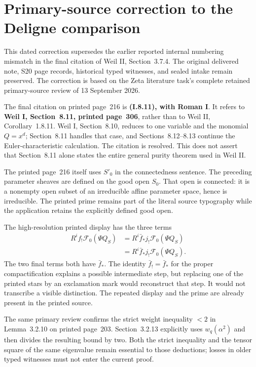 \section{Primary-source correction to the Deligne comparison}
\label{sec:deligne-primary-source-correction}

This dated correction supersedes the earlier reported internal numbering
mismatch in the final citation of Weil II, Section~3.7.4. The original
delivered note, S20 page records, historical typed witnesses, and sealed
intake remain preserved. The correction is based on the Zeta literature
task's complete retained primary-source review of 13 September 2026.

The final citation on printed page~216 is \textbf{(I.8.11), with Roman I}.
It refers to \textbf{Weil I, Section~8.11, printed page~306}, rather than
to Weil II, Corollary~1.8.11. Weil I, Section~8.10, reduces to one variable
and the monomial $Q=x^d$; Section~8.11 handles that case, and
Sections~8.12--8.13 continue the Euler-characteristic calculation.
The citation is resolved. This does not assert that Section~8.11 alone
states the entire general purity theorem used in Weil II.

The printed page~216 itself uses $S'_0$ in the connectedness sentence.
The preceding parameter sheaves are defined on the good open $S_0$.
That open is connected: it is a nonempty open subset of an irreducible
affine parameter space, hence is irreducible. The printed prime remains
part of the literal source typography while the application retains
the explicitly defined good open.

The high-resolution printed display has the three terms
\[
\begin{aligned}
 R^if_!\mathcal F_0(\Psi Q_S)
 &=R^i\bar f_*j_!\mathcal F_0(\Psi Q_S)\\
 &=R^i\bar f_*j_!\mathcal F_0(\Psi Q_S).
\end{aligned}
\]
The two final terms both have $\bar f_*$. The identity
$\bar f_!=\bar f_*$ for the proper compactification explains a
possible intermediate step, but replacing one of the printed stars
by an exclamation mark would reconstruct that step. It would not
transcribe a visible distinction. The repeated display and the prime
are already present in the printed source.

The same primary review confirms the strict weight inequality $<2$
in Lemma~3.2.10 on printed page~203. Section~3.2.13 explicitly uses
$w_q(\alpha^2)$ and then divides the resulting bound by two.
Both the strict inequality and the tensor square of the same
eigenvalue remain essential to those deductions; losses in older
typed witnesses must not enter the current proof.


